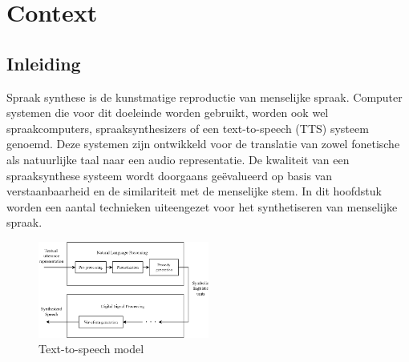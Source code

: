 \chapter{Context}


\section{Inleiding}

Spraak synthese is de kunstmatige reproductie van menselijke spraak. Computer systemen die voor dit doeleinde worden gebruikt, worden ook wel spraakcomputers, spraaksynthesizers of een text-to-speech (TTS) systeem genoemd. Deze systemen zijn ontwikkeld voor de translatie van zowel fonetische als natuurlijke taal naar een audio representatie. De kwaliteit van een spraaksynthese systeem wordt doorgaans geëvalueerd op basis van verstaanbaarheid en de similariteit met de menselijke stem. In dit hoofdstuk worden een aantal technieken uiteengezet voor het synthetiseren van menselijke spraak.

\begin{figure}[]
    \centering
    \includegraphics[width=0.5\textwidth]{figures/tts_system.png}
    \caption{Text-to-speech model \cite{speect}}
    \label{fig:tts}
\end{figure}

